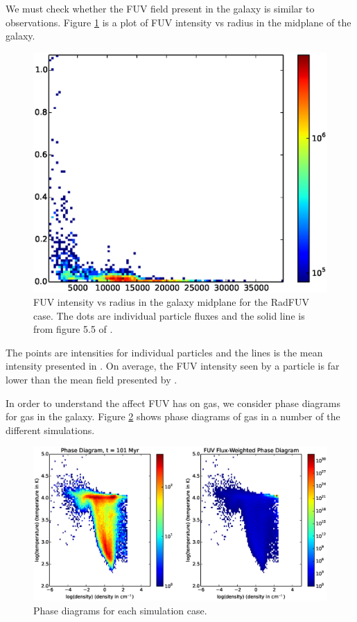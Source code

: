 We must check whether the FUV field present in the galaxy is similar to observations. Figure \ref{fig:intensitywolfire} is a plot of FUV intensity vs radius in the midplane of the galaxy.

\begin{figure}
\includegraphics[width=\textwidth]{graphics/intensityvrRadFB_FUV00101.eps}
\caption[FUV intensity vs radius]{FUV intensity vs radius in the galaxy midplane for the RadFUV case. The dots are individual particle fluxes and the solid line is from figure 5.5 of \citet{wolfireEt03}.}
\label{fig:intensitywolfire}
\end{figure}

The points are intensities for individual particles and the lines is the mean intensity presented in \citet{wolfireEt03}. On average, the FUV intensity seen by a particle is far lower than the mean field presented by \citet{wolfireEt03}.

In order to understand the affect FUV has on gas, we consider phase diagrams for gas in the galaxy. Figure \ref{fig:phasediagrams} shows phase diagrams of gas in a number of the different simulations.

\begin{figure}
\includegraphics[width=\textwidth]{graphics/phaseRadFUV00101.eps}
\caption[Phase diagrams with different physics]{Phase diagrams for each simulation case.}
\label{fig:phasediagrams}
\end{figure}

